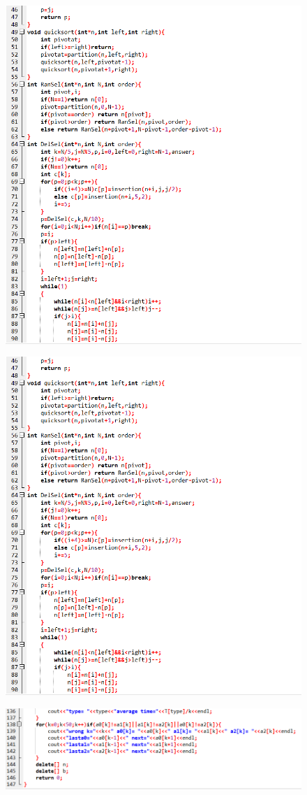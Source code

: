 \documentclass[12pt]{article}
\begin{document}
\begin{figure}[H]
\centering
\includegraphics[scale=0.6]{P8.png}
\end{figure}
\begin{figure}[H]
\centering
\includegraphics[scale=0.6]{P8.png}
\end{figure}
\begin{figure}[H]
\centering
\includegraphics[scale=0.6]{P10.png}
\end{figure}
\end{document}
